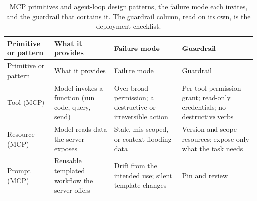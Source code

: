 \documentclass[
  letterpaper,
  11pt]{scrbook}
\begin{document}
\begin{longtable}[]{@{}
  >{\raggedright\arraybackslash}p{}
  >{\raggedright\arraybackslash}p{}
  >{\raggedright\arraybackslash}p{}
  >{\raggedright\arraybackslash}p{}@{}}
\caption{MCP primitives and agent-loop design patterns, the failure mode
each invites, and the guardrail that contains it. The guardrail column,
read on its own, is the deployment
checklist.}\label{tbl-agent-primitives}\tabularnewline
\toprule\noalign{}
\begin{minipage}[b]{\linewidth}\raggedright
Primitive or pattern
\end{minipage} & \begin{minipage}[b]{\linewidth}\raggedright
What it provides
\end{minipage} & \begin{minipage}[b]{\linewidth}\raggedright
Failure mode
\end{minipage} & \begin{minipage}[b]{\linewidth}\raggedright
Guardrail
\end{minipage} \\
\midrule\noalign{}
\endfirsthead
\toprule\noalign{}
\begin{minipage}[b]{\linewidth}\raggedright
Primitive or pattern
\end{minipage} & \begin{minipage}[b]{\linewidth}\raggedright
What it provides
\end{minipage} & \begin{minipage}[b]{\linewidth}\raggedright
Failure mode
\end{minipage} & \begin{minipage}[b]{\linewidth}\raggedright
Guardrail
\end{minipage} \\
\midrule\noalign{}
\endhead
\bottomrule\noalign{}
\endlastfoot
Tool (MCP) & Model invokes a function (run code, query, send) &
Over-broad permission; a destructive or irreversible action & Per-tool
permission grant; read-only credentials; no destructive verbs \\
Resource (MCP) & Model reads data the server exposes & Stale,
mis-scoped, or context-flooding data & Version and scope resources;
expose only what the task needs \\
Prompt (MCP) & Reusable templated workflow the server offers & Drift
from the intended use; silent template changes & Pin and review

\end{longtable}
\end{document}
